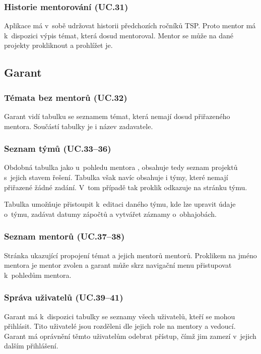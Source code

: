 \documentclass[czech,BP]{thesiskiv}
\begin{document}
			\subsubsection{Historie mentorování (UC.31)}
				\par Aplikace má v~sobě udržovat historii předchozích ročníků TSP. Proto mentor má k~dispozici výpis témat, která dosud mentoroval. Mentor se může na dané projekty prokliknout a prohlížet je.
		\subsection{Garant}
			\subsubsection{Témata bez mentorů (UC.32)}
			\par Garant vidí tabulku se seznamem témat, která nemají dosud přiřazeného mentora. Součástí tabulky je i název zadavatele.
			\subsubsection{Seznam týmů (UC.33--36)}
			\par Obdobná tabulka jako u~pohledu mentora , obsahuje tedy seznam projektů s~jejich stavem řešení. Tabulka však navíc obsahuje i týmy, které nemají přiřazené žádné zadání. V~tom případě tak proklik odkazuje na stránku týmu.
			\par Tabulka umožňuje přistoupit k~editaci daného týmu, kde lze upravit údaje o~týmu, zadávat datumy zápočtů a vytvářet záznamy o~obhajobách.
			\subsubsection{Seznam mentorů (UC.37--38)}
			\par Stránka ukazující propojení témat a jejich mentorů mentorů. Proklikem na jméno mentora je mentor zvolen a garant může skrz navigační menu přistupovat k~pohledům mentora.
			\subsubsection{Správa uživatelů (UC.39--41)}
			\par Garant má k~dispozici tabulky se seznamy všech uživatelů, kteří se mohou přihlásit. Tito uživatelé jsou rozděleni dle jejich role na mentory a vedoucí. Garant má oprávnění těmto uživatelům odebrat přístup, čímž jim zamezí v~jejich dalším přihlášení.
\end{document}
